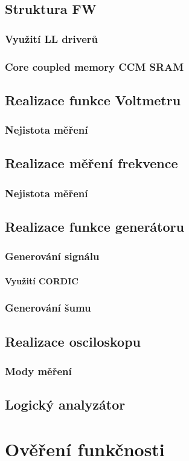 \section{Struktura FW}
\subsection{Využití LL driverů}
\subsection{Core coupled memory CCM SRAM}
\section{Realizace funkce Voltmetru}
\subsection{Nejistota měření}
\section{Realizace měření frekvence}
\subsection{Nejistota měření}
\section{Realizace funkce generátoru}
\subsection{Generování signálu}
\subsubsection{Využití CORDIC}    
\subsection{Generování šumu}
\section{Realizace osciloskopu}
\subsection{Mody měření}
\section{Logický analyzátor}
\chapter{Ověření funkčnosti}



